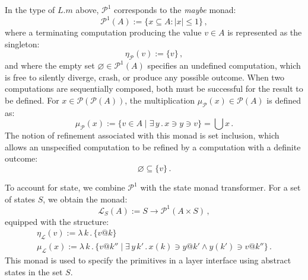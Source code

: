 \documentclass[11pt,oneside,draft]{book}
\theoremstyle{definition}
\begin{document}
In the type of $L.m$ above,
$\mathcal{P}^1$ corresponds to the \emph{maybe} monad:
\[
  \mathcal{P}^1(A) := \{ x \subseteq A : |x| \le 1 \} \,,
\]
where a terminating computation producing
the value $v \in A$ is represented as the singleton:
\[
  \eta_\mathcal{P}(v) := \{ v \} \,,
\]
and where the empty set $\varnothing \in \mathcal{P}^1(A)$
specifies an undefined computation,
which is free to silently diverge, crash, or
produce any possible outcome.
When two computations are sequentially composed,
both must be successful for the result to be defined.
For $x \in \mathcal{P}(\mathcal{P}(A))$,
the multiplication $\mu_\mathcal{P}(x) \in \mathcal{P}(A)$
is defined as:
\[
  \mu_\mathcal{P}(x) :=
    \{ v \in A \mid \exists \, y \,.\, x \ni y \ni v \} =
    \bigcup x
  \,.
\]
The notion of refinement associated with this monad is set inclusion,
which allows an unspecified computation to be refined by
a computation with a definite outcome:
\[
  \varnothing \subseteq \{ v \} \,.
\]

To account for state,
we combine $\mathcal{P}^1$ with the state monad transformer.
For a set of states $S$,
we obtain the monad:
\[
  \mathcal{L}_S(A) :=
    S \rightarrow \mathcal{P}^1({A} \times S) \,,
\]
equipped with the structure:
\begin{gather*}
  \eta_\mathcal{L}(v) :=
    \lambda \, k \,.\, \{ v@k \} \\
  \mu_\mathcal{L}(x) :=
    \lambda \, k \,.\, \{ v@k'' \mid
      \exists \, y \, k' \,.\, x(k) \ni y@k' \wedge y(k') \ni v@k'' \}
  \,.
\end{gather*}
This monad is used to specify the primitives
in a layer interface using abstract states in the set $S$.
\end{document}
